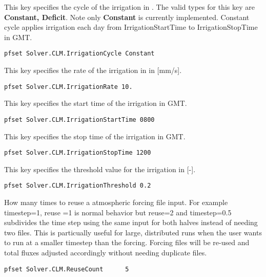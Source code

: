 {This key specifies the cycle of the irrigation in .  The valid types for this key are {\bf Constant, Deficit}. Note only {\bf Constant} is currently implemented.  Constant cycle applies irrigation each day from IrrigationStartTime to IrrigationStopTime in GMT.
}
\begin{display}\begin{verbatim}
pfset Solver.CLM.IrrigationCycle Constant
\end{verbatim}\end{display}

{This key specifies the rate of the irrigation in  in [mm/s].
}
\begin{display}\begin{verbatim}
pfset Solver.CLM.IrrigationRate 10.
\end{verbatim}\end{display}

{This key specifies the start time of the irrigation in  GMT.
}
\begin{display}\begin{verbatim}
pfset Solver.CLM.IrrigationStartTime 0800
\end{verbatim}\end{display}

{This key specifies the stop time of the irrigation in  GMT.
}
\begin{display}\begin{verbatim}
pfset Solver.CLM.IrrigationStopTime 1200
\end{verbatim}\end{display}

{This key specifies the threshold value for the irrigation in  [-].
}
\begin{display}\begin{verbatim}
pfset Solver.CLM.IrrigationThreshold 0.2
\end{verbatim}\end{display}

{How many times to reuse a  atmospheric forcing file input. For example timestep=1,
reuse =1 is normal behavior but reuse=2 and timestep=0.5 subdivides
the time step using the same  input for both halves instead of needing two files.
This is particually useful for large, distributed runs when the user wants to run \parflow{}
at a smaller timestep than the  forcing.  Forcing files will be re-used and
total fluxes adjusted accordingly without needing duplicate files.}
\begin{display}\begin{verbatim}
pfset Solver.CLM.ReuseCount      5
\end{verbatim}\end{display}

